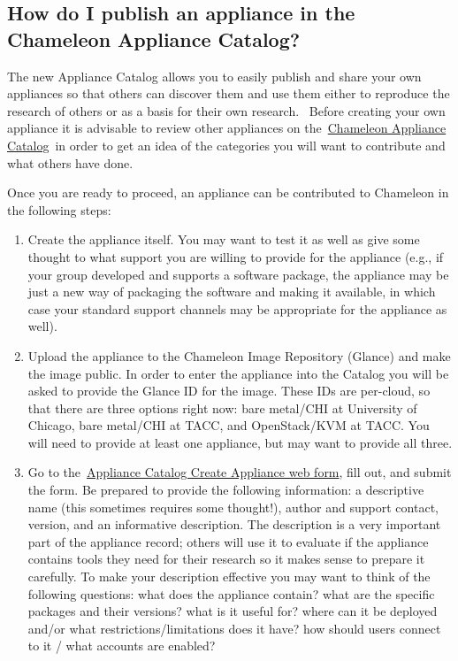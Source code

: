 \subsection{How do I publish an appliance in the Chameleon Appliance
Catalog?}\label{how-do-i-publish-an-appliance-in-the-chameleon-appliance-catalog}

The new Appliance Catalog allows you to easily publish and share your
own appliances so that others can discover them and use them either to
reproduce the research of others or as a basis for their own research.
~Before creating your own appliance it is advisable to review other
appliances on
the~\href{https://www.chameleoncloud.org/appliances/}{Chameleon
Appliance Catalog}~in order to get an idea of the categories you will
want to contribute and what others have done.~

Once you are ready to proceed, an appliance can be contributed to
Chameleon in the following steps:

\begin{enumerate}
\tightlist
\item
  Create the appliance itself. You may want to test it as well as give
  some thought to what support you are willing to provide for the
  appliance (e.g., if your group developed and supports a software
  package, the appliance may be just a new way of packaging the software
  and making it available, in which case your standard support channels
  may be appropriate for the appliance as well).
\item
  Upload the appliance to the Chameleon Image Repository (Glance) and
  make the image public. In order to enter the appliance into the
  Catalog you will be asked to provide the Glance ID for the image.
  These IDs are per-cloud, so that there are three options right now:
  bare metal/CHI at University of Chicago, bare metal/CHI at TACC, and
  OpenStack/KVM at TACC. You will need to provide at least one
  appliance, but may want to provide all three.
\item
  Go to
  the~\href{https://www.chameleoncloud.org/appliances/create/}{Appliance
  Catalog Create Appliance web form}, fill out, and submit the form. Be
  prepared to provide the following information: a descriptive name
  (this sometimes requires some thought!), author and support contact,
  version, and an informative description. The description is a very
  important part of the appliance record; others will use it to evaluate
  if the appliance contains tools they need for their research so it
  makes sense to prepare it carefully. To make your description
  effective you may want to think of the following questions: what does
  the appliance contain? what are the specific packages and their
  versions? what is it useful for? where can it be deployed and/or what
  restrictions/limitations does it have? how should users connect to it
  / what accounts are enabled?
\end{enumerate}

